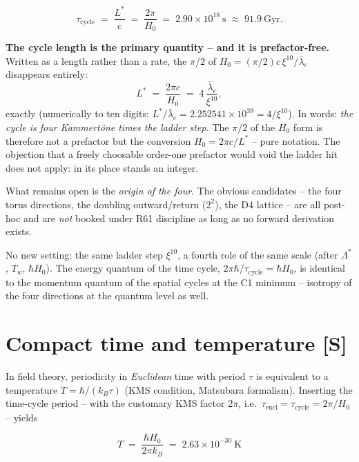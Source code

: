 \documentclass[11pt]{report}
\begin{document}
\begin{equation}
  \tau_\text{cycle} \;=\; \frac{L^{*}}{c}
  \;=\; \frac{2\pi}{H_0}
  \;=\; 2.90\times10^{18}~\text{s}
  \;\approx\; 91.9~\text{Gyr}.
    \label{eq:tauzyk}
\end{equation}

\textbf{The cycle length is the primary quantity -- and it is
prefactor-free.} Written as a length rather than a rate, the
$\pi/2$ of $H_0 = (\pi/2)c\,\xi^{10}/\bar\lambda_e$ disappears
entirely:
\begin{equation}
  L^{*} \;=\; \frac{2\pi c}{H_0}
  \;=\; 4\,\frac{\bar\lambda_e}{\xi^{10}},
  \label{eq:Lstar4}
\end{equation}
exactly (numerically to ten digits: $L^{*}/\bar\lambda_e =
2.252541\times10^{39} = 4/\xi^{10}$). In words: \emph{the cycle is
four Kammertöne times the ladder step.} The $\pi/2$ of the $H_0$
form is therefore not a prefactor but the conversion
$H_0 = 2\pi c/L^{*}$ -- pure notation. The objection that a freely
choosable order-one prefactor would void the ladder hit does not
apply: in its place stands an integer.

What remains open is the \emph{origin of the four}. The obvious
candidates -- the four torus directions, the doubling
outward/return ($2^2$), the D4 lattice -- are all post-hoc and are
\emph{not} booked under R61 discipline as long as no forward
derivation exists.

No new setting: the same ladder step $\xi^{10}$, a fourth role of
the same scale (after $\Lambda^{*}$, $T_w$, $\hbar H_0$). The
energy quantum of the time cycle, $2\pi\hbar/\tau_\text{cycle}
= \hbar H_0$, is identical to the momentum quantum of the spatial
cycles at the C1 minimum -- isotropy of the four directions at the
quantum level as well.

\section{Compact time and temperature [S]}

In field theory, periodicity in \emph{Euclidean} time with period
$\tau$ is equivalent to a temperature $T = \hbar/(k_B\tau)$ (KMS
condition, Matsubara formalism). Inserting the time-cycle period --
with the customary KMS factor $2\pi$, i.e.\
$\tau_\text{eucl} = \tau_\text{cycle} = 2\pi/H_0$ -- yields

\begin{equation}
  \boxed{\;T \;=\; \frac{\hbar H_0}{2\pi k_B}
  \;=\; 2.63\times10^{-30}~\text{K}\;}
  \label{eq:tgh}
\end{equation}
\end{document}
